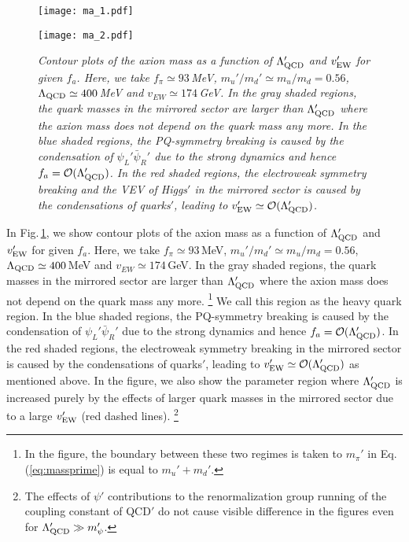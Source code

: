 \documentclass[aps,amsmath,preprint,epsf,superscriptaddress,nofootinbib,notitlepage]{revtex4-1}
\begin{document}
\begin{figure}[t]
\begin{center}
\begin{minipage}{.46\linewidth}
  \texttt{[image: ma\_1.pdf]}
 \end{minipage}
 \hspace{1cm}
 \begin{minipage}{.46\linewidth}
  \texttt{[image: ma\_2.pdf]}
 \end{minipage}
 \end{center}
\caption{\sl \small
Contour plots of the axion mass as a function of $\Lambda_{\rm QCD}'$ and $v_{\rm EW}'$ for given $f_a$.
Here, we take $f_\pi \simeq 93$\,MeV, $m_u'/m_d' \simeq m_u/m_d = 0.56$,  $\Lambda_{\rm QCD} \simeq 400$\,MeV and $v_{EW} \simeq 174$\,GeV. 
In the gray shaded regions, the quark masses in the mirrored sector are larger than $\Lambda_{\rm QCD}'$
where the axion mass does not depend on the quark mass any more.
In the blue shaded regions, the PQ-symmetry breaking is caused by the condensation of $\psi_L'\bar\psi_R'$ due to
the strong dynamics and hence $f_a = {\cal O}(\Lambda_{\rm QCD}')$.
In the red shaded regions, the electroweak symmetry breaking and the VEV of Higgs$'$ in the mirrored sector is caused by
the condensations of quarks$'$, leading to $v_{\rm EW}' \simeq {\cal O}(\Lambda_{\rm QCD}')$.
}
\label{fig:ma}
\end{figure}

In Fig.\,\ref{fig:ma}, we show  contour plots of the axion mass as a function of $\Lambda_{\rm QCD}'$ and $v_{\rm EW}'$ for given $f_a$.
Here, we take $f_\pi \simeq 93$\,MeV, $m_u'/m_d' \simeq m_u/m_d = 0.56$,  $\Lambda_{\rm QCD} \simeq 400$\,MeV and $v_{EW} \simeq 174$\,GeV. 
In the gray shaded regions, the quark masses in the mirrored sector are larger than $\Lambda_{\rm QCD}'$
where the axion mass does not depend on the quark mass any more.%
\footnote{In the figure, the boundary between these two regimes is taken to
$m_{\pi}'$ in Eq.\,(\ref{eq:massprime}) is equal to $m_u'+m_d'$.}
We call this region as the heavy quark region.
In the blue shaded regions, the PQ-symmetry breaking is caused by the condensation of $\psi_L'\bar\psi_R'$ due to
the strong dynamics and hence $f_a = {\cal O}(\Lambda_{\rm QCD}')$.
In the red shaded regions, the electroweak symmetry breaking in the mirrored sector 
is caused by the condensations of quarks$'$, leading to $v_{\rm EW}' \simeq {\cal O}(\Lambda_{\rm QCD}')$ as mentioned above.
In the figure, we also show the parameter region where $\Lambda_{\rm QCD}'$ is increased purely by the effects 
of larger quark masses in the mirrored sector due to a large $v_{\rm EW}'$ (red dashed lines).%
\footnote{The effects of  $\psi'$ contributions to the renormalization group running of the coupling constant 
of QCD$'$ do not cause visible difference in the figures even for $\Lambda_{\rm QCD}' \gg m_{\psi}'$.}
\end{document}
